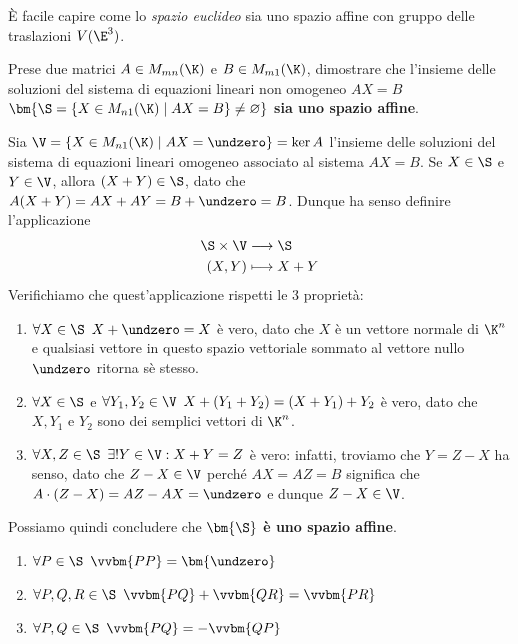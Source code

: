 \documentclass[11pt, a4paper, titlepage, oneside]{scrbook}
\begin{document}
È facile capire come lo \textit{spazio euclideo} sia uno spazio affine con gruppo delle traslazioni $V(\E^3)$.

\Esempio \nopagebreak

Prese due matrici $A \in M_{mn}(\K)$ e $B \in M_{m1}(\K)$, dimostrare che l'insieme delle soluzioni del sistema di equazioni lineari non omogeneo $AX = B$ $\bm{\S = \{X \in M_{n1}(\K) \mid AX = B\} \neq \varnothing}$ \textbf{sia uno spazio affine}. \nopagebreak

Sia $\V = \{X \in M_{n1}(\K) \mid AX = \undzero\} = \ker A$ l'insieme delle soluzioni del sistema di equazioni lineari omogeneo associato al sistema $AX = B$. Se $X \in \S$ e $Y \in \V$, allora $(X+Y) \in \S$, dato che $A(X + Y) = AX + AY = B + \undzero = B$. Dunque ha senso definire l'applicazione
\begin{align*}
\S \times \V &\longrightarrow \S \\
(X,Y) &\longmapsto X + Y
\end{align*}
Verifichiamo che quest'applicazione rispetti le 3 proprietà:
\begin{enumerate}
    \item $\forall X \in \S \enspace X + \undzero = X$ è vero, dato che $X$ è un vettore normale di $\K^n$ e qualsiasi vettore in questo spazio vettoriale sommato al vettore nullo $\undzero$ ritorna sè stesso.
    \item $\forall X \in \S$ e $\forall Y_1, Y_2 \in \V \enspace X + (Y_1 + Y_2) = (X + Y_1) + Y_2$ è vero, dato che $X,Y_1$ e $Y_2$ sono dei semplici vettori di $\K^n$.
    \item $\forall X,Z \in \S \enspace \exists ! Y \in \V: X + Y = Z$ è vero: infatti, troviamo che $Y = Z - X$ ha senso, dato che $Z - X \in \V$ perché $AX = AZ = B$ significa che $A \cdot (Z - X) = AZ - AX = \undzero$ e dunque $Z - X \in \V$.
\end{enumerate}
Possiamo quindi concludere che $\bm{\S}$ \textbf{è uno spazio affine}.

\begin{Proprieta}
\label{prop-spazi-affini}
\begin{enumerate}[label=\alph*)]
    \item $\forall P \in \S \enspace \vvbm{PP} = \bm{\undzero}$ 
    \item $\forall P,Q,R \in \S \enspace \vvbm{PQ} + \vvbm{QR} = \vvbm{PR}$
    \item $\forall P,Q \in \S \enspace \vvbm{PQ} = - \vvbm{QP}$
\end{enumerate}
\end{Proprieta}
\end{document}
